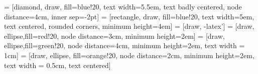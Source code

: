 \documentclass[landscape]{article}
\begin{document}
\pagestyle{empty}


 = [diamond, draw, fill=blue!20, 
    text width=5.5em, text badly centered, node distance=4cm, inner sep=-2pt]
 = [rectangle, draw, fill=blue!20, 
    text width=5em, text centered, rounded corners, minimum height=4em]
 = [draw, -latex']
 = [draw, ellipse,fill=red!20, node distance=3cm,
    minimum height=2em]
 = [draw, ellipse,fill=green!20, node distance=4cm,
    minimum height=2em, text width = 1cm]
 = [draw, ellipse, fill=orange!20, node distance=2cm,
    minimum height=2em, text width = 0.5cm, text centered]
    
\end{document}
